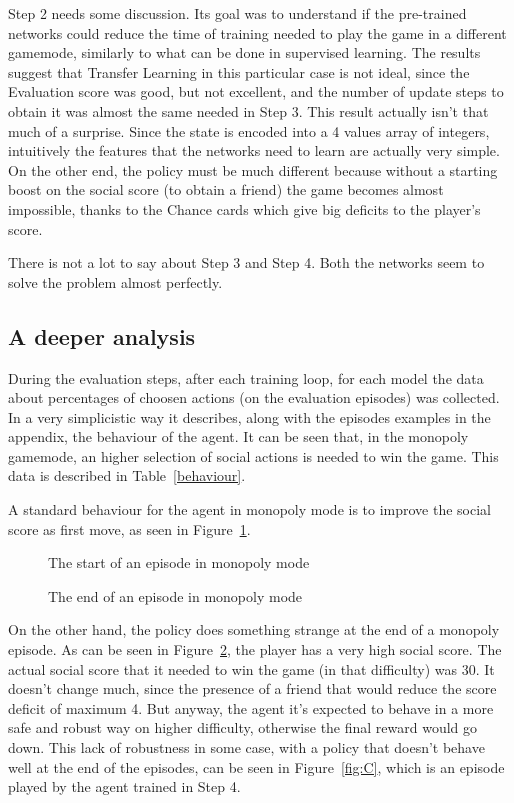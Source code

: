 \documentclass{article}
\begin{document}
Step 2 needs some discussion. Its goal was to understand if the pre-trained networks could reduce the time of training needed to play the game in a different gamemode, similarly to what can be done in supervised learning. The results suggest that Transfer Learning in this particular case is not ideal, since the Evaluation score was good, but not excellent, and the number of update steps to obtain it was almost the same needed in Step 3. This result actually isn't that much of a surprise. Since the state is encoded into a 4 values array of integers, intuitively the features that the networks need to learn are actually very simple. On the other end, the policy must be much different because without a starting boost on the social score (to obtain a friend) the game becomes almost impossible, thanks to the Chance cards which give big deficits to the player's score.

There is not a lot to say about Step 3 and Step 4. Both the networks seem to solve the problem almost perfectly.

\subsection{A deeper analysis}
During the evaluation steps, after each training loop, for each model the data about percentages of choosen actions (on the evaluation episodes) was collected. In a very simplicistic way it describes, along with the episodes examples in the appendix, the behaviour of the agent. It can be seen that, in the monopoly gamemode, an higher selection of social actions is needed to win the game. This data is described in Table~\ref{behaviour}. 

A standard behaviour for the agent in monopoly mode is to improve the social score as first move, as seen in Figure~\ref{fig:A}.
\begin{figure}
  \centering
  \caption{The start of an episode in monopoly mode}
  \label{fig:A}
\end{figure}

\begin{figure}
  \centering
  \caption{The end of an episode in monopoly mode}
  \label{fig:B}
\end{figure} 

On the other hand, the policy does something strange at the end of a monopoly episode. As can be seen in Figure~\ref{fig:B}, the player has a very high social score. The actual social score that it needed to win the game (in that difficulty) was 30. It doesn't change much, since the presence of a friend that would reduce the score deficit of maximum 4. But anyway, the agent it's expected to behave in a more safe and robust way on higher difficulty, otherwise the final reward would go down. This lack of robustness in some case, with a policy that doesn't behave well at the end of the episodes, can be seen in Figure~\ref{fig:C}, which is an episode played by the agent trained in Step 4.
\end{document}
